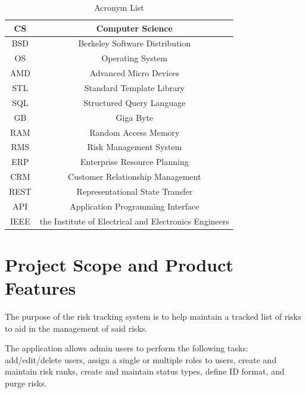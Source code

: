 \documentclass[letterpaper,12pt,oneside,listof=totoc]{scrreprt}
\begin{document}
\begin{table} [H]
\begin{center}
\begin{tabular}{|c|c|}
    \hline
    CS  &  Computer Science \\
    \hline
    BSD & Berkeley Software Distribution \\
    \hline
    OS  & Operating System \\
    \hline
    AMD & Advanced Micro Devices \\
    \hline
    STL & Standard Template Library \\
    \hline
    SQL & Structured Query Language \\
    \hline
    GB  & Giga Byte \\
    \hline
    RAM & Random Access Memory \\
    \hline
    RMS & Risk Management System\\
    \hline
    ERP & Enterprise Resource Planning \\
    \hline
    CRM & Customer Relationship Management \\
    \hline
    REST & Representational State Transfer \\ 
    \hline
    API & Application Programming Interface \\
    \hline
    IEEE & the Institute of Electrical and Electronics Engineers \\
    \hline
\end{tabular}
\end{center}
\caption{Acronym List}
\end{table}

\section{Project Scope and Product Features}
The purpose of the risk tracking system is to help maintain a tracked list of risks to aid in the management of said risks. \newline

\noindent The application allows admin users to perform the following tasks: add/edit/delete users, assign a single or multiple roles to users, create and maintain risk ranks, create and maintain status types, define ID format, and purge risks. \newline
\end{document}
